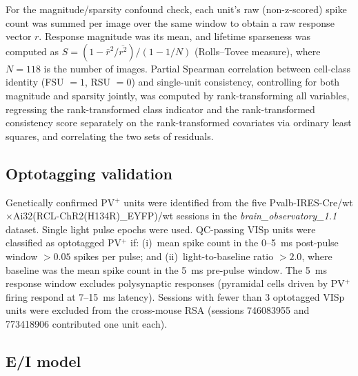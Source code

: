 \documentclass[11pt,onecolumn]{article}
\begin{document}
For the magnitude/sparsity confound check, each unit's raw (non-z-scored)
spike count was summed per image over the same window to obtain a raw
response vector $r$.  Response magnitude was its mean, and lifetime
sparseness was computed as $S = \left(1 - \bar r^2 / \overline{r^2}\right)
/ \left(1 - 1/N\right)$ (Rolls--Tovee measure), where $N = 118$ is the
number of images.  Partial Spearman correlation between cell-class
identity (FSU $=1$, RSU $=0$) and single-unit consistency, controlling for
both magnitude and sparsity jointly, was computed by rank-transforming
all variables, regressing the rank-transformed class indicator and the
rank-transformed consistency score separately on the rank-transformed
covariates via ordinary least squares, and correlating the two sets of
residuals.

\subsection{Optotagging validation}

Genetically confirmed PV$^+$ units were identified from the five
Pvalb-IRES-Cre/wt$\times$Ai32(RCL-ChR2(H134R)\_EYFP)/wt sessions in
the \textit{brain\_observatory\_1.1} dataset.  Single light pulse epochs
were used.  QC-passing VISp units were classified as optotagged PV$^+$
if: (i)~mean spike count in the 0--5~ms post-pulse window $> 0.05$ spikes
per pulse; and (ii)~light-to-baseline ratio $> 2.0$, where baseline was
the mean spike count in the 5~ms pre-pulse window.  The 5~ms response
window excludes polysynaptic responses (pyramidal cells driven by PV$^+$
firing respond at 7--15~ms latency).  Sessions with fewer than 3
optotagged VISp units were excluded from the cross-mouse RSA (sessions
746083955 and 773418906 contributed one unit each).

\subsection{E/I model}
\end{document}
